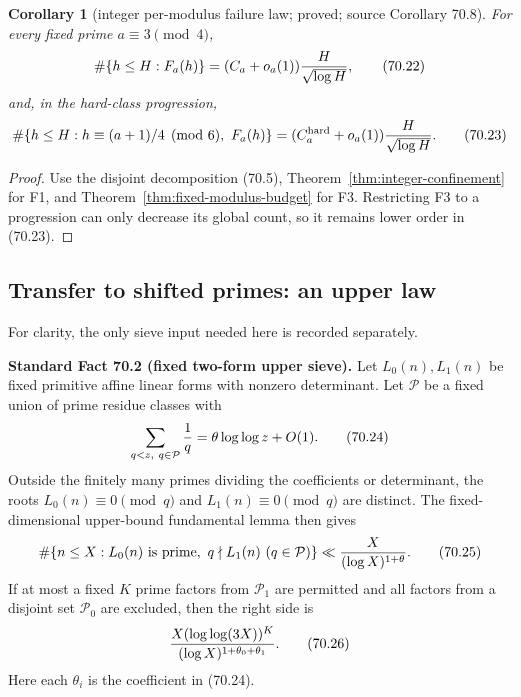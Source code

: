 \documentclass[10pt,reqno]{amsart}
\newtheorem{corollary}[theorem]{Corollary}
\theoremstyle{definition}
\newcommand{\1}{\mathbf 1}
\begin{document}
\begin{corollary}[integer per-modulus failure law; proved; source Corollary 70.8]\label{cor:integer-failure-law}  For every
fixed prime $a\equiv3\pmod4$,
\begin{equation}
 \#\{h\leq H:F_a(h)\}
       =(C_a+o_a(1)){H\over\sqrt{\log H}},                 \tag{70.22}
\end{equation}
and, in the hard-class progression,
\begin{equation}
 \#\{h\leq H:h\equiv(a+1)/4\pmod6,\ F_a(h)\}
       =(C_a^{\rm hard}+o_a(1)){H\over\sqrt{\log H}}.     \tag{70.23}
\end{equation}

\end{corollary}
\begin{proof} Use the disjoint decomposition (70.5), Theorem~\ref{thm:integer-confinement} for F1, and
Theorem~\ref{thm:fixed-modulus-budget} for F3.  Restricting F3 to a progression can only decrease its
global count, so it remains lower order in (70.23).
\end{proof}

\subsection{Transfer to shifted primes: an upper law}

For clarity, the only sieve input needed here is recorded separately.

\medskip\noindent\textbf{Standard Fact 70.2 (fixed two-form upper sieve).}  Let $L_0(n),L_1(n)$
be fixed primitive affine linear forms with nonzero determinant.  Let
${\mathcal P}$ be a fixed union of prime residue classes with
\begin{equation}
             \sum_{q<z,\ q\in{\mathcal P}}{1\over q}
                    =\theta\log\log z+O(1).               \tag{70.24}
\end{equation}
Outside the finitely many primes dividing the coefficients or determinant,
the roots $L_0(n)\equiv0\pmod q$ and
$L_1(n)\equiv0\pmod q$ are distinct.  The fixed-dimensional
upper-bound fundamental lemma then gives
\begin{equation}
 \#\{n\leq X:L_0(n)\text{ is prime},\
                    q\nmid L_1(n)\ (q\in{\mathcal P})\}
       \ll {X\over(\log X)^{1+\theta}}.                   \tag{70.25}
\end{equation}
If at most a fixed $K$ prime factors from ${\mathcal P}_1$ are permitted
and all factors from a disjoint set ${\mathcal P}_0$ are excluded, then the
right side is
\begin{equation}
 {X(\log\log(3X))^K\over
       (\log X)^{1+\theta_0+\theta_1}}.                   \tag{70.26}
\end{equation}
Here each $\theta_i$ is the coefficient in (70.24).
\end{document}
